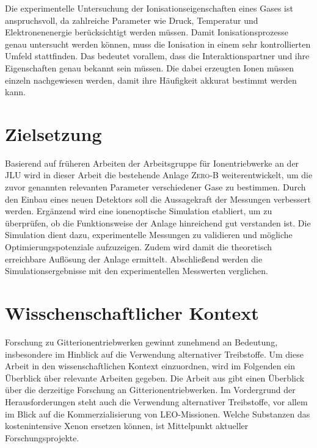 Die experimentelle Untersuchung der Ionisationseigenschaften eines Gases ist anspruchsvoll, da zahlreiche Parameter wie Druck, Temperatur und Elektronenenergie berücksichtigt werden müssen. Damit Ionisationsprozesse genau untersucht werden können, muss die Ionisation in einem sehr kontrollierten Umfeld stattfinden. Das bedeutet vorallem, dass die Interaktionspartner und ihre Eigenschaften genau bekannt sein müssen. Die dabei erzeugten Ionen müssen einzeln nachgewiesen werden, damit ihre Häufigkeit akkurat bestimmt werden kann. 

\section{Zielsetzung}
Basierend auf früheren Arbeiten der Arbeitsgruppe für Ionentriebwerke an der JLU wird in dieser Arbeit die bestehende Anlage \textsc{Zero-B} weiterentwickelt, um die zuvor genannten relevanten Parameter verschiedener Gase zu bestimmen. Durch den Einbau eines neuen Detektors soll die Aussagekraft der Messungen verbessert werden. Ergänzend wird eine ionenoptische Simulation etabliert, um zu überprüfen, ob die Funktionsweise der Anlage hinreichend gut verstanden ist. Die Simulation dient dazu, experimentelle Messungen zu validieren und mögliche Optimierungspotenziale aufzuzeigen. Zudem wird damit die theoretisch erreichbare Auflösung der Anlage ermittelt. Abschließend werden die Simulationsergebnisse mit den experimentellen Messwerten verglichen.

\section{Wisschenschaftlicher Kontext}
Forschung zu Gitterionentriebwerken gewinnt zunehmend an Bedeutung, insbesondere im Hinblick auf die Verwendung alternativer Treibstoffe. Um diese Arbeit in den wissenschaftlichen Kontext einzuordnen, wird im Folgenden ein Überblick über relevante Arbeiten gegeben. Die Arbeit aus \cite{ion} gibt einen Überblick über die derzeitige Forschung an Gitterionentriebwerken. Im Vordergrund der Herausforderungen steht auch die Verwendung alternativer Treibstoffe, vor allem im Blick auf die Kommerzialisierung von LEO-Missionen. Welche Substanzen das kostenintensive Xenon ersetzen können, ist Mittelpunkt aktueller Forschungsprojekte.
 
